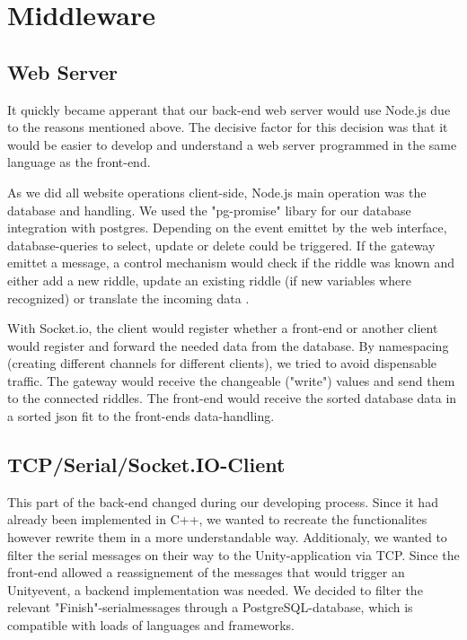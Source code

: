 \section{Middleware}

\subsection{Web Server}
It quickly became apperant that our back-end web server would use Node.js due to the reasons mentioned above.
The decisive factor for this decision was that it would be easier to develop and understand a web server programmed in the same language as the front-end.

As we did all website operations client-side, Node.js main operation was the database and handling. 
We used the "pg-promise" libary \parencite{pg-promise} for our database integration with postgres. 
Depending on the event emittet by the web interface, database-queries to select, update or delete could be triggered.
If the gateway emittet a message, a control mechanism would check if the riddle was known and either add a new riddle, update an existing riddle (if new variables where recognized) or translate the incoming data .

With Socket.io, the client would register whether a front-end or another client would register and forward the needed data from the database. 
By namespacing (creating different channels for different clients), we tried to avoid dispensable traffic.
The gateway would receive the changeable ("write") values and send them to the connected riddles.
The front-end would receive the sorted database data in a sorted json fit to the front-ends data-handling.

\subsection{TCP/Serial/Socket.IO-Client}
This part of the back-end changed during our developing process. 
Since it had already been implemented in C++, we wanted to recreate the functionalites however rewrite them in a more understandable way. 
Additionaly, we wanted to filter the serial messages on their way to the Unity-application via TCP.
Since the front-end allowed a reassignement of the messages that would trigger an Unityevent, a backend implementation was needed.
We decided to filter the relevant "Finish"-serialmessages through a PostgreSQL-database, which is compatible with loads of languages and frameworks.

